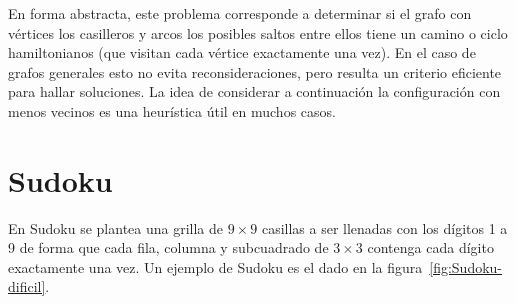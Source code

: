  En forma abstracta,
  este problema corresponde a determinar
  si el grafo con vértices los casilleros
  y arcos los posibles saltos entre ellos
  tiene un camino o ciclo hamiltonianos
  (que visitan cada vértice exactamente una vez).
  En el caso de grafos generales esto no evita reconsideraciones,
  pero resulta un criterio eficiente para hallar soluciones.
  La idea de considerar a continuación
  la configuración con menos vecinos es una heurística útil en muchos casos.

\section{Sudoku}
\label{sec:sudoku}

  En Sudoku se plantea una grilla de \(9 \times 9\) casillas
  a ser llenadas con los dígitos \num{1} a \num{9}
  de forma que cada fila, columna y subcuadrado de \(3 \times 3\)
  contenga cada dígito exactamente una vez.
  Un ejemplo de Sudoku
  es el dado en la figura~\ref{fig:Sudoku-dificil}.
